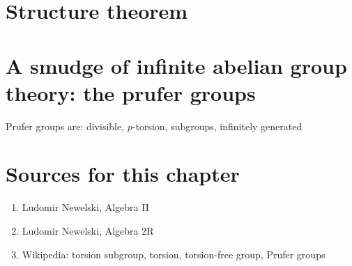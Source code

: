 \section{Structure theorem}

\section{A smudge of infinite abelian group theory: the prufer groups}

Prufer groups are: divisible, \( p \)-torsion, subgroups, infinitely generated

\section{Sources for this chapter}

\begin{enumerate}
    \item Ludomir Newelski, Algebra II
    \item Ludomir Newelski, Algebra 2R
    \item Wikipedia: torsion subgroup, torsion, torsion-free group, Prufer groups
\end{enumerate}


